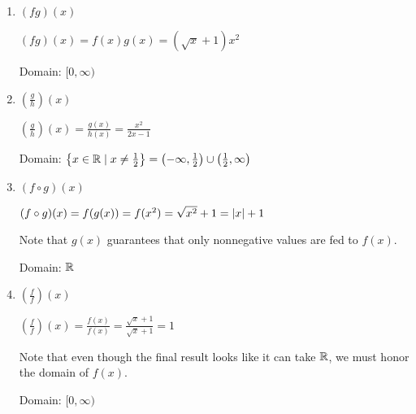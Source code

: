 \documentclass[letterpaper,12pt,fleqn]{article}
\begin{document}
\begin{enumerate}
\begin{enumerate}
  \item $(fg)(x)$

    $(fg)(x)=f(x)g(x)=(\sqrt{x}+1)x^2$

    Domain: $[0,\infty)$

  \item $\left(\frac{g}{h}\right)(x)$
      
    $\left(\frac{g}{h}\right)(x)=\frac{g(x)}{h(x)}=\frac{x^2}{2x-1}$

    Domain: $\left\{x\in\mathbb{R}\mid x\ne\frac{1}{2}\right\}=
    \left(-\infty,\frac{1}{2}\right)\cup\left(\frac{1}{2},\infty\right)$
    
  \item $(f\circ g)(x)$

    $(f\circ g)(x)= f(g(x))=f(x^2)=\sqrt{x^2}+1=\lvert x\rvert+1$

    Note that $g(x)$ guarantees that only nonnegative values are fed to $f(x)$.

    Domain: $\mathbb{R}$
    
  \item $\left(\frac{f}{f}\right)(x)$

    $\left(\frac{f}{f}\right)(x)=\frac{f(x)}{f(x)}=
    \frac{\sqrt{x}+1}{\sqrt{x}+1}=1$

    Note that even though the final result looks like it can take $\mathbb{R}$, we
    must honor the domain of $f(x)$.

    Domain: $[0,\infty)$
  \end{enumerate}
\end{enumerate}
\end{document}
